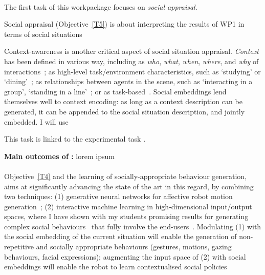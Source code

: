 \paragraph{\TBA}

The first task of this workpackage focuses on \emph{social appraisal}.

Social appraisal (Objective~\ref{T5}) is about interpreting the results of WP1
in terms of social situations

Context-awareness is another critical aspect of social situation appraisal.
\emph{Context} has been defined in various way, including as \emph{who},
\emph{what}, \emph{when}, \emph{where}, and \emph{why} of
interactions~\cite{vinciarelli2009social}; as high-level task/environment
characteristics, such as `studying' or `dining'~\cite{nigam2015social}; as
relationships between agents in the scene, such as `interacting in a group',
`standing in a line'~\cite{althaus2004navigation}; or as
task-based~\cite{castellano2012detecting}. Social embeddings lend themselves
well to context encoding: as long as a context description can be generated, it
can be appended to the social situation description, and jointly embedded.
I will use 
%


This task is linked to the experimental task \TDB.


\begin{framed}
    {\noindent\bf Main outcomes of \tBA:} lorem ipsum 
\end{framed}

\paragraph{\TBB}

Objective~\ref{T4} and the learning of socially-appropriate behaviour
generation, \project aims at significantly advancing the state of the art in
this regard, by combining two techniques: (1) generative neural networks
for affective robot motion
generation~\cite{marmpena2019generating,suguitan2020moveae}; (2) interactive
machine learning in high-dimensional input/output spaces, where I have shown
with my students promising results for generating complex social
behaviours~\cite{senft2019teaching, winkle2020couch} that fully involve the
end-users~\cite{winkle2018social}. Modulating (1) with the social embedding of
the current situation will enable the generation of non-repetitive and socially
appropriate behaviours (gestures, motions, gazing behaviours, facial
expressions); augmenting the input space of (2) with social embeddings will
enable the robot to learn contextualised social policies

